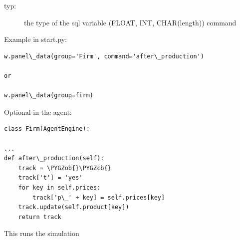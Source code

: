\documentclass[letterpaper,10pt,english]{sphinxmanual}
\def\PYGZob{\char`\{}
\def\PYGZcb{\char`\}}
\begin{document}
\begin{fulllineitems}
\begin{fulllineitems}
\begin{description}
\begin{description}
\item[{typ:}] \leavevmode
the type of the sql variable (FLOAT, INT, CHAR(length))
command

\end{description}

\end{description}

Example in start.py:

\begin{Verbatim}[commandchars=\\\{\}]
w.panel\_data(group='Firm', command='after\_production')

or

w.panel\_data(group=firm)
\end{Verbatim}

Optional in the agent:

\begin{Verbatim}[commandchars=\\\{\}]
class Firm(AgentEngine):

...
def after\_production(self):
    track = \PYGZob{}\PYGZcb{}
    track['t'] = 'yes'
    for key in self.prices:
        track['p\_' + key] = self.prices[key]
    track.update(self.product[key])
    return track
\end{Verbatim}

\end{fulllineitems}


\begin{fulllineitems}
\label{simulation:abce.Simulation.run}
This runs the simulation

\end{fulllineitems}


\end{fulllineitems}

\end{document}

